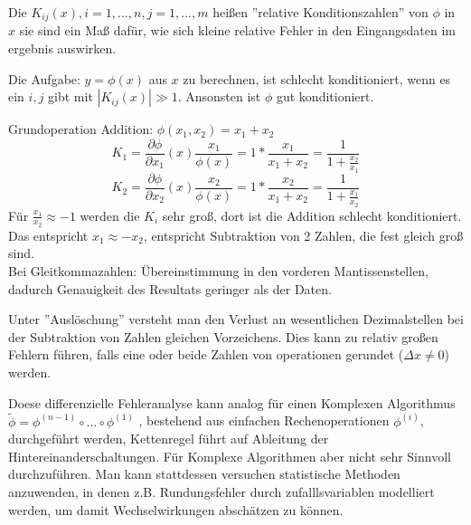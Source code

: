 \documentclass[../Skript.tex]{subfiles}
\begin{document}
\begin{definition} Die $K_{ij}(x), i=1,...,n, j=1,...,m$ heißen ''relative Konditionszahlen'' von $\phi$ in $x$ sie sind ein Maß dafür, wie sich kleine relative Fehler in den Eingangsdaten im ergebnis auswirken.
\end{definition}
Die Aufgabe: $y=\phi (x)$ aus $x$ zu berechnen, ist schlecht konditioniert, wenn es ein $i,j$ gibt mit $|K_{ij}(x)| \gg 1$. Ansonsten ist $\phi$ gut konditioniert.\\
\begin{example}
    
 Grundoperation Addition: $\phi(x_1,x_2) = x_1+x_2$\\
$$K_1= \frac{\partial \phi}{\partial x_1}(x)\frac{x_1}{\phi(x)}= 1*\frac{x_1}{x_1+x_2} =\frac{1}{1+\frac{x_2}{x_1}}$$
$$K_2=\frac{\partial \phi}{\partial x_2}(x)\frac{x_2}{\phi(x)}= 1*\frac{x_2}{x_1+x_2} =\frac{1}{1+\frac{x_1}{x_2}}$$
Für $\frac{x_1}{x_2}\approx -1$ werden die $K_i$ sehr groß, dort ist die Addition schlecht konditioniert. \\
Das entspricht $x_1\approx -x_2$, entspricht Subtraktion von 2 Zahlen, die fest gleich groß sind.\\
Bei Gleitkommazahlen: Übereinstimmung in den  vorderen Mantissenstellen, dadurch Genauigkeit des Resultats geringer als der Daten.\\
\end{example}
\begin{definition}
Unter ''Auslöschung'' versteht man den Verlust an wesentlichen Dezimalstellen bei der Subtraktion von Zahlen gleichen Vorzeichens.
Dies kann zu relativ großen Fehlern führen, falls eine oder beide Zahlen von operationen gerundet ($\Delta x \neq 0$) werden.
\end{definition}
\begin{remark}
Doese differenzielle Fehleranalyse kann analog für einen Komplexen Algorithmus $\tilde{\phi}= \phi^{(n-1)}\circ ... \circ \phi^{(1)}$ ,
bestehend aus einfachen Rechenoperationen $\phi^{(i)}$, durchgeführt werden, Kettenregel führt auf Ableitung der Hintereinanderschaltungen.
Für Komplexe Algorithmen aber nicht sehr Sinnvoll durchzuführen. Man kann stattdessen versuchen statistische Methoden anzuwenden,
in denen z.B. Rundungsfehler durch zufalllsvariablen modelliert werden, um damit Wechselwirkungen abschätzen zu können.
\end{remark}
\end{document}
